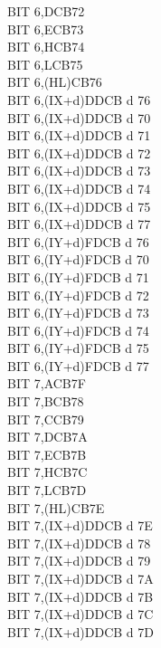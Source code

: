 \begin{multicols}{3}
{\begin{tabbing}
        BIT 6,D\>CB72\\
        BIT 6,E\>CB73\\
        BIT 6,H\>CB74\\
        BIT 6,L\>CB75\\
        BIT 6,(HL)\>CB76\\
        BIT 6,(IX+d)\>DDCB d 76\\
        BIT 6,(IX+d)\UNDOC\>DDCB d 70\\
        BIT 6,(IX+d)\UNDOC\>DDCB d 71\\
        BIT 6,(IX+d)\UNDOC\>DDCB d 72\\
        BIT 6,(IX+d)\UNDOC\>DDCB d 73\\
        BIT 6,(IX+d)\UNDOC\>DDCB d 74\\
        BIT 6,(IX+d)\UNDOC\>DDCB d 75\\
        BIT 6,(IX+d)\UNDOC\>DDCB d 77\\
        BIT 6,(IY+d)\>FDCB d 76\\
        BIT 6,(IY+d)\UNDOC\>FDCB d 70\\
        BIT 6,(IY+d)\UNDOC\>FDCB d 71\\
        BIT 6,(IY+d)\UNDOC\>FDCB d 72\\
        BIT 6,(IY+d)\UNDOC\>FDCB d 73\\
        BIT 6,(IY+d)\UNDOC\>FDCB d 74\\
        BIT 6,(IY+d)\UNDOC\>FDCB d 75\\
        BIT 6,(IY+d)\UNDOC\>FDCB d 77\\
        BIT 7,A\>CB7F\\
        BIT 7,B\>CB78\\
        BIT 7,C\>CB79\\
        BIT 7,D\>CB7A\\
        BIT 7,E\>CB7B\\
        BIT 7,H\>CB7C\\
        BIT 7,L\>CB7D\\
        BIT 7,(HL)\>CB7E\\
        BIT 7,(IX+d)\>DDCB d 7E\\
        BIT 7,(IX+d)\UNDOC\>DDCB d 78\\
        BIT 7,(IX+d)\UNDOC\>DDCB d 79\\
        BIT 7,(IX+d)\UNDOC\>DDCB d 7A\\
        BIT 7,(IX+d)\UNDOC\>DDCB d 7B\\
        BIT 7,(IX+d)\UNDOC\>DDCB d 7C\\
        BIT 7,(IX+d)\UNDOC\>DDCB d 7D\\

\end{tabbing}}
\end{multicols}
